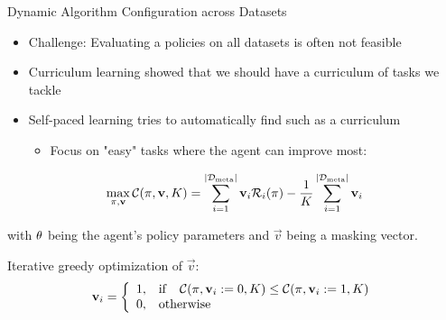 \begin{frame}[c]{Dynamic Algorithm Configuration across Datasets }
	
\begin{itemize}
	\item Challenge: Evaluating a policies on all datasets is often not feasible
	\pause
	\item Curriculum learning  showed that we should have a curriculum of tasks we tackle
	\pause
	\item Self-paced learning  tries to automatically find such as a curriculum
	\begin{itemize}
		\item Focus on "easy" tasks where the agent can improve most:
	\end{itemize}
\end{itemize}
	
\pause
\begin{equation} 
\label{spl_loss}
\max_{\pi,\mathbf{v}}\mathcal{C}(\pi, \mathbf{v}, K) = \sum^{|\mathcal{D}_{\text{meta}}|}_{i=1} \mathbf{v}_i\mathcal{R}_i(\pi) - \frac{1}{K} \sum^{|\mathcal{D}_{\text{meta}}|}_{i=1} \mathbf{v}_i \nonumber
\end{equation}

with $\theta$ being the agent's policy parameters and $\vec{v}$ being a masking vector.

\pause
\medskip

Iterative greedy optimization of $\vec{v}$:
\begin{equation}
\mathbf{v}_i = \left\{
\begin{array}{ll}
1, &  \mathrm{if}\quad\mathcal{C}(\pi, \mathbf{v}_{i}:=0, K) \leq \mathcal{C}(\pi, \mathbf{v}_{i}:=1, K)\\
0, & \mathrm{otherwise}
\end{array}
\right.\nonumber
\end{equation}
\end{frame}


